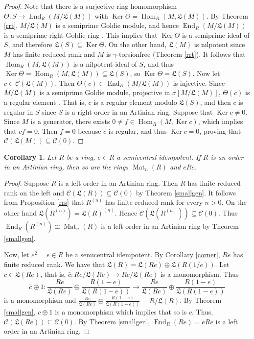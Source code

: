 \documentclass{amsart}
\newtheorem{cor}[thm]{Corollary}
\theoremstyle{definition}
\theoremstyle{remark}
\numberwithin{equation}{section}
\DeclareMathOperator{\Ker}{Ker}
\DeclareMathOperator{\Mat}{Mat}
\DeclareMathOperator{\Hom}{Hom}
\DeclareMathOperator{\End}{End}
\begin{document}
\begin{proof}
	Note that there is a surjective ring homomorphism 
	$\Theta:S\to \End_R(M/\mathfrak{L}(M))$ with 
	$\Ker\Theta=\Hom_R(M,\mathfrak{L}(M))$. 
	By Theorem \ref{rrt}, 
	$M/\mathfrak{L}(M)$ is a semiprime Goldie module,
	and hence $\End_R(M/\mathfrak{L}(M))$ 
	is a semiprime right Goldie ring \cite[Theorem 2.22]{maugoldie}. 
	This implies that $\Ker\Theta$ is a semiprime ideal of $S$, 
	and therefore $\mathfrak{L}(S)\subseteq\Ker\Theta$. 
	On the other hand, 
	$\mathfrak{L}(M)$ is nilpotent 
	since $M$ has finite reduced rank and $M$ is $\gamma$-torsionfree 
	(Theorem \ref{rrt}). 
	It follows that $\Hom_R(M,\mathfrak{L}(M))$ is a nilpotent ideal of $S$, 
	and thus $\Ker\Theta=\Hom_R(M,\mathfrak{L}(M))\subseteq\mathfrak{L}(S)$, 
	so $\Ker\Theta=\mathfrak{L}(S)$. 
	Now let $c\in\mathcal{C}(\mathfrak{L}(M))$. 
	Then $\Theta(c)\in\End_R(M/\mathfrak{L}(M))$ is injective. Since $M/\mathfrak{L}(M)$ is a semiprime Goldie module, projective in $\sigma\left[ M/\mathfrak{L}(M)\right]$, $\Theta(c)$ is a regular element \cite[11.5]{wisbauermodules}. 
	That is, $c$ is a regular element modulo $\mathfrak{L}(S)$, 
	and then $c$ is regular in $S$ 
	since $S$ is a right order in an Artinian ring. 
	Suppose that $\Ker c\neq 0$. 
	Since $M$ is a generator, 
	there exists $0\neq f\in\Hom_R(M,\Ker c)$, 
	which implies that $cf=0$. 
	Then $f=0$ because $c$ is regular, 
	and thus $\Ker c=0$, 
	proving that $\mathcal{C}(\mathfrak{L}(M))\subseteq\mathcal{C}(0)$.
\end{proof}


\begin{cor}
	Let $R$ be a ring, $e\in R$ a semicentral idempotent. If $R$ is an order in an Artinian ring, then so are the rings $\Mat_n(R)$ and $eRe$.
\end{cor}

\begin{proof}
	Suppose $R$ is a left order in an Artinian ring. Then $R$ has finite reduced rank on the left and $\mathcal{C}(\mathfrak{L}(R))\subseteq\mathcal{C}(0)$ by Theorem \ref{smallgen}. It follows from Proposition \ref{rrs} that $R^{(n)}$ has finite reduced rank for every $n>0$. On the other hand $\mathfrak{L}(R^{(n)})=\mathfrak{L}(R)^{(n)}$. Hence $\mathcal{C}(\mathfrak{L}(R^{(n)}))\subseteq\mathcal{C}(0)$. Thus $\End_R(R^{(n)})\cong\Mat_n(R)$ is a left order in an Artinian ring by Theorem \ref{smallgen}.
	
	Now, let $e^2=e\in R$ be a semicentral idempotent. By Corollary \ref{corner}, $Re$ has finite reduced rank. We have that $\mathfrak{L}(R)=\mathfrak{L}(Re)\oplus\mathfrak{L}(R(1/e))$. Let $c\in\mathfrak{L}(Re)$, that is, $\bar{c}:Re/\mathfrak{L}(Re)\to Re/\mathfrak{L}(Re)$ is a monomorphism. Thus 
	\[\bar{c}\oplus\bar{1}:\frac{Re}{\mathfrak{L}(Re)}\oplus \frac{R(1-e)}{\mathfrak{L}(R(1-e))}\rightarrow \frac{Re}{\mathfrak{L}(Re)}\oplus \frac{R(1-e)}{\mathfrak{L}(R(1-e))}\]
	is a monomorphism and $\frac{Re}{\mathfrak{L}(Re)}\oplus \frac{R(1-e)}{\mathfrak{L}(R(1-e))}=R/\mathfrak{L}(R)$. By Theorem \ref{smallgen}, $c\oplus 1$ is a monomorphism which implies that so is $c$. Thus, $\mathcal{C}(\mathfrak{L}(Re))\subseteq\mathcal{C}(0)$. By Theorem \ref{smallgen}, $\End_R(Re)=eRe$ is a left order in an Artinian ring. 
\end{proof}
\end{document}

